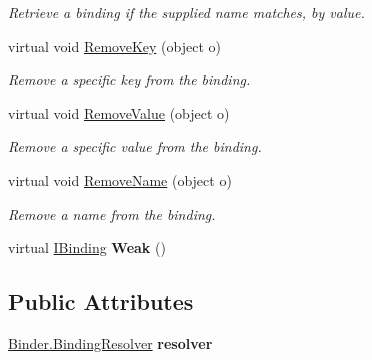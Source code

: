\begin{DoxyCompactItemize}
\begin{DoxyCompactList}\small\item\em Retrieve a binding if the supplied name matches, by value. \end{DoxyCompactList}\item 
\hypertarget{classstrange_1_1framework_1_1impl_1_1_binding_aea72624611f06e26d5f0e29470ccfb76}{virtual void \hyperlink{classstrange_1_1framework_1_1impl_1_1_binding_aea72624611f06e26d5f0e29470ccfb76}{Remove\-Key} (object o)}\label{classstrange_1_1framework_1_1impl_1_1_binding_aea72624611f06e26d5f0e29470ccfb76}

\begin{DoxyCompactList}\small\item\em Remove a specific key from the binding. \end{DoxyCompactList}\item 
\hypertarget{classstrange_1_1framework_1_1impl_1_1_binding_a278e130e4402e099201c308da15871f4}{virtual void \hyperlink{classstrange_1_1framework_1_1impl_1_1_binding_a278e130e4402e099201c308da15871f4}{Remove\-Value} (object o)}\label{classstrange_1_1framework_1_1impl_1_1_binding_a278e130e4402e099201c308da15871f4}

\begin{DoxyCompactList}\small\item\em Remove a specific value from the binding. \end{DoxyCompactList}\item 
\hypertarget{classstrange_1_1framework_1_1impl_1_1_binding_a5c8d21d0817375050735c39727126cf7}{virtual void \hyperlink{classstrange_1_1framework_1_1impl_1_1_binding_a5c8d21d0817375050735c39727126cf7}{Remove\-Name} (object o)}\label{classstrange_1_1framework_1_1impl_1_1_binding_a5c8d21d0817375050735c39727126cf7}

\begin{DoxyCompactList}\small\item\em Remove a name from the binding. \end{DoxyCompactList}\item 
\hypertarget{classstrange_1_1framework_1_1impl_1_1_binding_af5dc4c853e083759d39947b15cf7c218}{virtual \hyperlink{interfacestrange_1_1framework_1_1api_1_1_i_binding}{I\-Binding} {\bfseries Weak} ()}\label{classstrange_1_1framework_1_1impl_1_1_binding_af5dc4c853e083759d39947b15cf7c218}

\end{DoxyCompactItemize}
\subsection*{Public Attributes}
\begin{DoxyCompactItemize}
\item 
\hypertarget{classstrange_1_1framework_1_1impl_1_1_binding_a3143beff45f6b1b1b1933b5839702b6e}{\hyperlink{classstrange_1_1framework_1_1impl_1_1_binder_aa4e977fc31063ca4d0b029b1abe39dad}{Binder.\-Binding\-Resolver} {\bfseries resolver}}\label{classstrange_1_1framework_1_1impl_1_1_binding_a3143beff45f6b1b1b1933b5839702b6e}

\end{DoxyCompactItemize}
